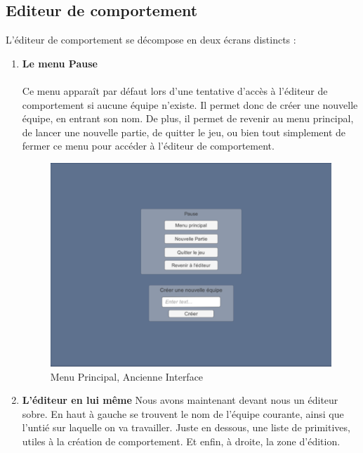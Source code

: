 \documentclass{report}
\begin{document}
\subsection{Editeur de comportement}
L'éditeur de comportement se décompose en deux écrans distincts  : 
\begin{enumerate}
\item\textbf{Le menu Pause}
\paragraph{}
Ce menu apparaît par défaut lors d'une tentative d'accès à l'éditeur de comportement si aucune équipe n'existe. Il permet donc de créer une nouvelle équipe, en entrant son nom.\newline
De plus, il permet de revenir au menu principal, de lancer une nouvelle partie, de quitter le jeu, ou bien tout simplement de fermer ce menu pour accéder à l'éditeur de comportement.\newline

\begin{figure}[!h]
	\centering
		\includegraphics[scale=0.30]{PauseMenuOld}
	\caption{Menu Principal, Ancienne Interface}
\end{figure}

\item\textbf{L'éditeur en lui même}\newline
Nous avons maintenant devant nous un éditeur sobre. En haut à gauche se trouvent le nom de l'équipe courante, ainsi que l'untié sur laquelle on va travailler.\newline
Juste en dessous, une liste de primitives, utiles à la création de comportement.\newline
Et enfin, à droite, la zone d'édition.


\end{enumerate}
\end{document}
